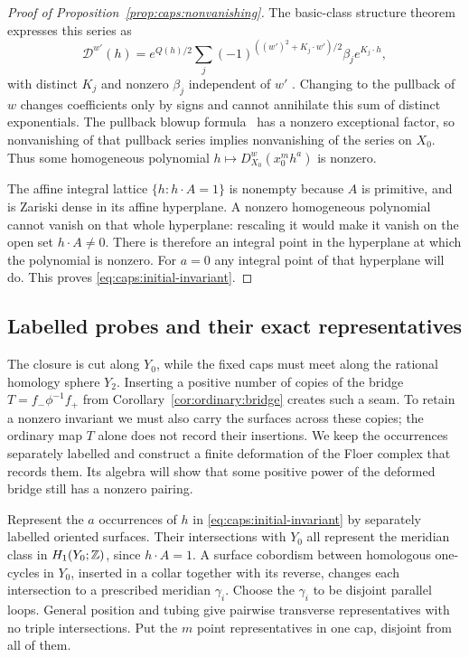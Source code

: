 \begin{proof}[Proof of Proposition~\ref{prop:caps:nonvanishing}]
The basic-class structure theorem expresses this series as
\begin{equation}\label{eq:caps:structure-series}
 \mathcal D^{w'}(h)=e^{Q(h)/2}
   \sum_j(-1)^{((w')^2+K_j\cdot w')/2}\beta_j e^{K_j\cdot h},
\end{equation}
with distinct $K_j$ and nonzero $\beta_j$ independent of $w'$
\cite[Theorem~1.7]{KronheimerMrowka1995}.
Changing to the pullback of $w$ changes coefficients only by signs and
cannot annihilate this sum of distinct exponentials.  The pullback
blowup formula~\cite[Proposition~1.9]{KronheimerMrowka1995} has a
nonzero exceptional factor, so nonvanishing of
that pullback series implies nonvanishing of the series on $X_0$.
Thus some homogeneous polynomial $h\mapsto D^w_{X_0}(x_0^m h^a)$
is nonzero.

The affine integral lattice $\{h:h\cdot A=1\}$ is nonempty because
$A$ is primitive, and is Zariski dense in its affine hyperplane.  A
nonzero homogeneous polynomial cannot vanish on that whole hyperplane:
rescaling it would make it vanish on the open set $h\cdot A\ne0$.
There is therefore an integral point in the hyperplane at which the
polynomial is nonzero.  For $a=0$ any integral point of that hyperplane
will do.  This proves \eqref{eq:caps:initial-invariant}.
\end{proof}

\subsection{Labelled probes and their exact representatives}

The closure is cut along $Y_0$, while the fixed caps must meet along the
rational homology sphere $Y_2$.  Inserting a positive number of copies of
the bridge $T=f_-\phi^{-1}f_+$ from
Corollary~\ref{cor:ordinary:bridge} creates such a seam.  To retain a
nonzero invariant we must also carry the surfaces across these copies;
the ordinary map $T$ alone does not record their insertions.  We keep
the occurrences separately labelled and construct a finite deformation
of the Floer complex that records them.  Its algebra will show that some
positive power of the deformed bridge still has a nonzero pairing.

Represent the $a$ occurrences of $h$ in
\eqref{eq:caps:initial-invariant} by separately labelled oriented
surfaces.  Their intersections with $Y_0$ all represent the meridian
class in $H_1(Y_0;\mathbb Z)$, since $h\cdot A=1$.  A surface cobordism
between homologous one-cycles in $Y_0$, inserted in a collar together
with its reverse, changes each intersection to a prescribed meridian
$\gamma_i$.  Choose the $\gamma_i$ to be disjoint parallel loops.
General position and tubing give pairwise transverse representatives
with no triple intersections.  Put the $m$ point representatives in one
cap, disjoint from all of them.

